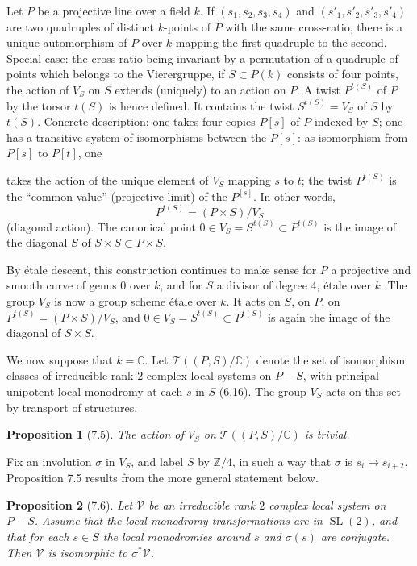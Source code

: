 \documentclass[10pt]{article}
\newcommand{\C}{\mathbb C}
\newcommand{\Z}{\mathbb Z}
\newcommand{\SL}{\operatorname{SL}}
\theoremstyle{deligne}
\newtheorem*{proposition*}{Proposition}
\newcommand{\heading}[1]{\vspace{0.7em}\noindent{\bfseries #1}\quad}
\begin{document}
\heading{7.3.} Let $P$ be a projective line over a field $k$. If $(s_1,s_2,s_3,s_4)$ and $(s'_1,s'_2,s'_3,s'_4)$ are two quadruples of distinct $k$-points of $P$ with the same cross-ratio, there is a unique automorphism of $P$ over $k$ mapping the first quadruple to the second. Special case: the cross-ratio being invariant by a permutation of a quadruple of points which belongs to the Vierergruppe, if $S\subset P(k)$ consists of four points, the action of $V_S$ on $S$ extends (uniquely) to an action on $P$. A twist $P^{t(S)}$ of $P$ by the torsor $t(S)$ is hence defined. It contains the twist $S^{t(S)}=V_S$ of $S$ by $t(S)$. Concrete description: one takes four copies $P[s]$ of $P$ indexed by $S$; one has a transitive system of isomorphisms between the $P[s]$: as isomorphism from $P[s]$ to $P[t]$, one


takes the action of the unique element of $V_S$ mapping $s$ to $t$; the twist $P^{t(S)}$ is the ``common value'' (projective limit) of the $P^{[s]}$. In other words,
\[
P^{t(S)}=(P\times S)/V_S
\]
(diagonal action). The canonical point $0\in V_S=S^{t(S)}\subset P^{t(S)}$ is the image of the diagonal $S$ of $S\times S\subset P\times S$.

By \'{e}tale descent, this construction continues to make sense for $P$ a projective and smooth curve of genus $0$ over $k$, and for $S$ a divisor of degree $4$, \'{e}tale over $k$. The group $V_S$ is now a group scheme \'{e}tale over $k$. It acts on $S$, on $P$, on $P^{t(S)}=(P\times S)/V_S$, and $0\in V_S=S^{t(S)}\subset P^{t(S)}$ is again the image of the diagonal of $S\times S$.

\heading{7.4.} We now suppose that $k=\C$. Let $\mathcal T((P,S)/\C)$ denote the set of isomorphism classes of irreducible rank $2$ complex local systems on $P-S$, with principal unipotent local monodromy at each $s$ in $S$ (6.16). The group $V_S$ acts on this set by transport of structures.

\begin{proposition*}[7.5]
The action of $V_S$ on $\mathcal T((P,S)/\C)$ is trivial.
\end{proposition*}

Fix an involution $\sigma$ in $V_S$, and label $S$ by $\Z/4$, in such a way that $\sigma$ is $s_i\mapsto s_{i+2}$. Proposition 7.5 results from the more general statement below.

\begin{proposition*}[7.6]
Let $\mathcal V$ be an irreducible rank $2$ complex local system on $P-S$. Assume that the local monodromy transformations are in $\SL(2)$, and that for each $s\in S$ the local monodromies around $s$ and $\sigma(s)$ are conjugate. Then $\mathcal V$ is isomorphic to $\sigma^*\mathcal V$.
\end{proposition*}
\end{document}
